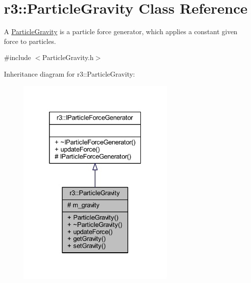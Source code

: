 \hypertarget{classr3_1_1_particle_gravity}{}\section{r3\+:\+:Particle\+Gravity Class Reference}
\label{classr3_1_1_particle_gravity}


A \mbox{\hyperlink{classr3_1_1_particle_gravity}{Particle\+Gravity}} is a particle force generator, which applies a constant given force to particles.  




{\ttfamily \#include $<$Particle\+Gravity.\+h$>$}



Inheritance diagram for r3\+:\+:Particle\+Gravity\+:\nopagebreak
\begin{figure}[H]
\begin{center}
\leavevmode
\includegraphics[width=220pt]{classr3_1_1_particle_gravity__inherit__graph}
\end{center}
\end{figure}


